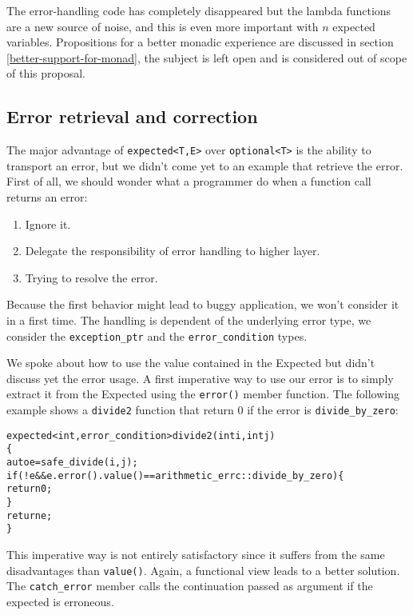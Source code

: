 \documentclass[a4paper,10pt]{article}
\newcommand{\cpp}[1]{\lstinline{#1}}
\begin{document}
The error-handling code has completely disappeared but the lambda functions are a new source of noise, and this is even more important with $n$ expected variables. Propositions for a better monadic experience are discussed in section \ref{better-support-for-monad}, the subject is left open and is considered out of scope of this proposal.

\subsection{Error retrieval and correction}

The major advantage of \cpp{expected<T,E>} over \cpp{optional<T>} is the ability to transport an error, but we didn't come yet to an example that retrieve the error. First of all, we should wonder what a programmer do when a function call returns an error:

\begin{enumerate}
 \item Ignore it.
 \item Delegate the responsibility of error handling to higher layer.
 \item Trying to resolve the error.
\end{enumerate}

Because the first behavior might lead to buggy application, we won't consider it in a first time. The handling is dependent of the underlying error type, we consider the \cpp{exception_ptr} and the \cpp{error_condition} types.

We spoke about how to use the value contained in the Expected but didn't discuss yet the error usage. A first imperative way to use our error is to simply extract it from the Expected using the \cpp{error()} member function. The following example shows a \cpp{divide2} function that return 0 if the error is \cpp{divide_by_zero}:

\begin{alltt}
expected<int, error_condition> divide2(int i, int j)
\{
  auto e = safe_divide(i,j);
  if (!e && e.error().value() == arithmetic_errc::divide_by_zero) \{
    return 0;
  \}
  return e;
\}
\end{alltt}

This imperative way is not entirely satisfactory since it suffers from the same disadvantages than \cpp{value()}. Again, a functional view leads to a better solution. The \cpp{catch_error} member calls the continuation passed as argument if the expected is erroneous.
\end{document}
